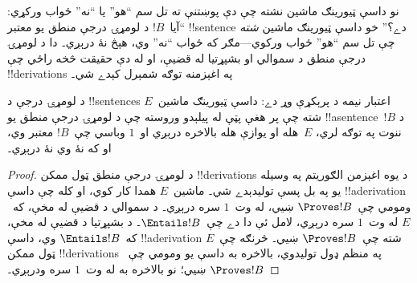 \documentclass[../../../include/open-logic-section]{subfiles}
\begin{document}
\begin{explain}
نو داسې ټيورينګ ماشين نشته چې دې پوښتنې ته تل سم ``هو'' يا ``نه''
ځواب ورکړي: ``آيا~$!B$ د لومړۍ درجې منطق يو معتبر !!{sentence}
دے؟'' خو داسې ټيورينګ ماشين \emph{شته} چې تل سم ``هو'' ځواب
ورکوي---مګر که ځواب ``نه'' وي، هېڅ نۀ درېږي۔ دا د لومړۍ درجې منطق
د سموالي او بشپړتيا له قضيې، او له دې حقيقت څخه راځي چې
!!{derivation}s په اغېزمنه توګه شمېرل کېدے شي۔
\end{explain}

\begin{thm}
  د لومړۍ درجې د !!{sentence}s اعتبار نيمه د پرېکړې وړ دے: داسې
  ټيورينګ ماشين~$E$ شته چې پر هغې پټې له پيلېدو وروسته چې د لومړۍ
  درجې منطق يو !!a{sentence}~$!B$ د ننوت په توګه لري، $E$~هله او يوازې
  هله بالاخره درېږي او~$1$ وباسي چې~$!B$ معتبر وي، او که نۀ وي نۀ
  درېږي۔
\end{thm}

\begin{proof}
  د لومړۍ درجې منطق ټول ممکن !!{derivation}s د يوه اغېزمن الګوريتم
  په وسيله يو په بل پسې توليدېدے شي۔ ماشين~$E$ همدا کار کوي، او کله
  چې داسې !!a{derivation} ومومي چې~$\Proves !B$ ښيي، له وت~$1$ سره
  درېږي۔ د سموالي د قضيې له مخې، که~$E$ له وت~$1$ سره درېږي، لامل
  ئې دا دے چې~$\Entails !B$۔ د بشپړتيا د قضيې له مخې، که~$\Entails
  !B$ وي، داسې !!a{derivation} شته چې~$\Proves !B$ ښيي۔ څرنګه
  چې~$E$ ټول ممکن !!{derivation}s په منظم ډول توليدوي، بالاخره به
  داسې يو ومومي چې~$\Proves !B$ ښيي؛ نو بالاخره به له وت~$1$ سره
  ودرېږي۔
\end{proof}
\end{document}
